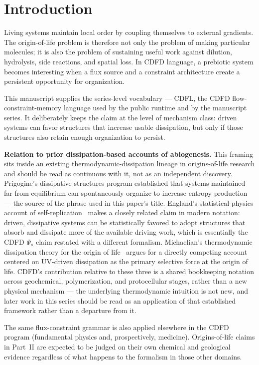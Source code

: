 \documentclass[11pt,a4paper]{article}
\begin{document}
\section{Introduction}
Living systems maintain local order by coupling themselves to external gradients. The origin-of-life problem is therefore not only the problem of making particular molecules; it is also the problem of sustaining useful work against dilution, hydrolysis, side reactions, and spatial loss. In CDFD language, a prebiotic system becomes interesting when a flux source and a constraint architecture create a persistent opportunity for organization.

This manuscript supplies the series-level vocabulary --- CDFL, the CDFD flow-constraint-memory language used by the public runtime and by the manuscript series. It deliberately keeps the claim at the level of mechanism class: driven systems can favor structures that increase usable dissipation, but only if those structures also retain enough organization to persist.

\textbf{Relation to prior dissipation-based accounts of abiogenesis.}
This framing sits inside an existing thermodynamic-dissipation lineage in origins-of-life research and should be read as continuous with it, not as an independent discovery. Prigogine's dissipative-structures program established that systems maintained far from equilibrium can spontaneously organize to increase entropy production~\cite{PrigogineNicolis1977} --- the source of the phrase used in this paper's title. England's statistical-physics account of self-replication~\cite{England2013} makes a closely related claim in modern notation: driven, dissipative systems can be statistically favored to adopt structures that absorb and dissipate more of the available driving work, which is essentially the CDFD $\Psi_s$ claim restated with a different formalism. Michaelian's thermodynamic dissipation theory for the origin of life~\cite{Michaelian2011,Michaelian2017} argues for a directly competing account centered on UV-driven dissipation as the primary selective force at the origin of life. CDFD's contribution relative to these three is a shared bookkeeping notation across geochemical, polymerization, and protocellular stages, rather than a new physical mechanism --- the underlying thermodynamic intuition is not new, and later work in this series should be read as an application of that established framework rather than a departure from it.

The same flux-constraint grammar is also applied elsewhere in the CDFD program (fundamental physics and, prospectively, medicine). Origins-of-life claims in Part~II are expected to be judged on their own chemical and geological evidence regardless of what happens to the formalism in those other domains.
\end{document}

